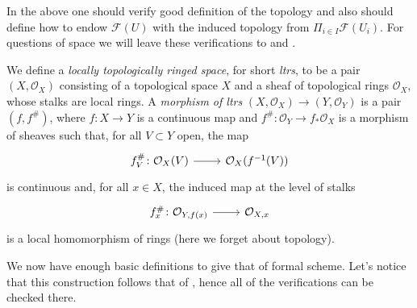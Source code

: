 \documentclass[../Main]{subfiles}
\begin{document}
\begin{rem}[]
	In the above one should verify good definition of the topology
	and also should define how to endow $\mathcal{F}(U)$
	with the induced topology from $\Pi_{i \in I} \mathcal{F}(U_i)$.
	For questions of space we will leave these verifications to
	\cite[\href{https://stacks.math.columbia.edu/tag/0AHY}{Section 0AHY}]{SP}
	and \cite[\S10]{EGA1}.
\end{rem}


\begin{defn}
	We define a {\em locally topologically ringed space}, 
	for short {\em ltrs}, to be a pair
	$( X , \mathcal{O}_{ X } )$ consisting of a topological space $X$
	and a sheaf of topological rings $\mathcal{O}_X$,
	whose stalks are local rings.
	A {\em morphism of ltrs}
	$( X , \mathcal{O}_{ X } ) \to  ( Y , \mathcal{O}_{ Y } )$
	is a pair $\left(f, f^\#\right)$,
	where $f\colon X \to Y$ is a continuous map
	and $f^\#\colon \mathcal{O}_Y \to f_* \mathcal{O}_X$ is
	a morphism of sheaves such that, for all $V \subset Y$ open,
	the map
	\begin{equation*}
	\begin{tikzcd}[row sep = 0ex
		,/tikz/column 1/.append style={anchor=base east}
		,/tikz/column 2/.append style={anchor=base west}]
		f^\#_V\colon \mathcal{O}_{ X }(V) \arrow[r, "", rightarrow] &
		\mathcal{O}_{ X }(f^{-1}(V))
	\end{tikzcd}
	\end{equation*} 
	is continuous and, for all $x \in X$, the induced map at the level
	of stalks
	\begin{equation*}
	\begin{tikzcd}[row sep = 0ex
		,/tikz/column 1/.append style={anchor=base east}
		,/tikz/column 2/.append style={anchor=base west}]
		f^\#_x\colon \mathcal{O}_{ Y,f(x) } \arrow[r, "", rightarrow] &
		\mathcal{O}_{ X,x }
	\end{tikzcd}
	\end{equation*} 
	is a local homomorphism of rings (here we forget about topology).
\end{defn}


We now have enough basic definitions to give that of formal scheme.
Let's notice that this construction follows that of \cite[\S10]{EGA1},
hence all of the verifications can be checked there.
\end{document}
